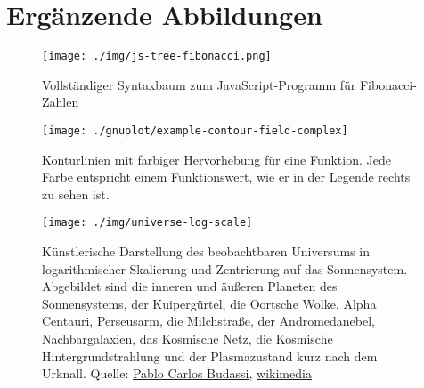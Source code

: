 \chapter{Ergänzende Abbildungen}

\begin{figure}[H]
    \centering
    \texttt{[image: ./img/js-tree-fibonacci.png]}
    \caption{Vollständiger Syntaxbaum zum JavaScript-Programm für Fibonacci-Zahlen}
    \label{fig:JsFibonacciBaum}
\end{figure}

\begin{figure}[H]
    \centering
    \texttt{[image: ./gnuplot/example-contour-field-complex]}
    \caption{Konturlinien mit farbiger Hervorhebung für eine Funktion. Jede Farbe entspricht einem Funktionswert, wie er in der Legende rechts zu sehen ist.}
    \label{fig:ContourComplexFun}
\end{figure}

\begin{figure}[H]
    \centering
    \texttt{[image: ./img/universe-log-scale]}
    \caption{Künstlerische Darstellung des beobachtbaren Universums in logarithmischer Skalierung und Zentrierung auf das Sonnensystem. Abgebildet sind die inneren und äußeren Planeten des Sonnensystems, der Kuipergürtel, die Oortsche Wolke, Alpha Centauri, Perseusarm, die Milchstraße, der Andromedanebel, Nachbargalaxien, das Kosmische Netz, die Kosmische Hintergrundstrahlung und der Plasmazustand kurz nach dem Urknall. Quelle: \href{https://commons.wikimedia.org/wiki/User:Unmismoobjetivo}{Pablo Carlos Budassi}, \href{https://commons.wikimedia.org/wiki/File:Observable_universe_logarithmic_illustration.png}{wikimedia}}
    \label{fig:UniLogScale}
\end{figure}
